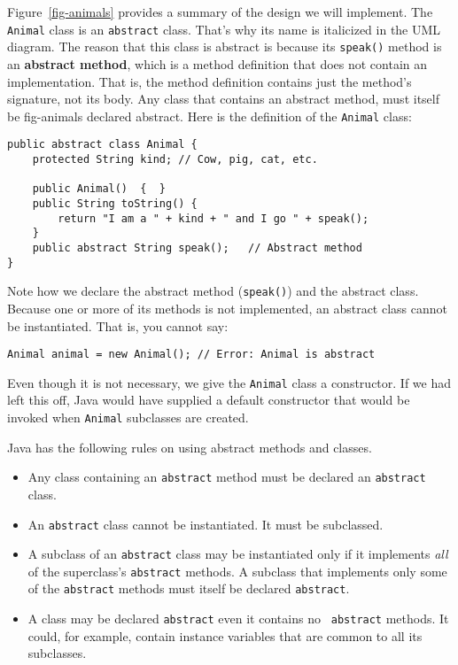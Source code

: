 Figure~\ref{fig-animals} provides a summary of the design we will implement. The
{\tt Animal} class is an {\tt abstract} class. That's why its name is
italicized in the UML diagram. The reason that this class is abstract
is because its {\tt speak()} method is an {\bf abstract method}, which
is a method definition that does not contain an implementation. That
is, the method definition contains just the method's signature, not
its body. Any class that contains an abstract method, must itself be
{fig-animals}
declared abstract. Here is the definition of the {\tt Animal} class:

\begin{jjjlisting}
\begin{lstlisting}
public abstract class Animal {
    protected String kind; // Cow, pig, cat, etc.
         
    public Animal()  {  }
    public String toString() {
        return "I am a " + kind + " and I go " + speak();
    }
    public abstract String speak();   // Abstract method
}
\end{lstlisting}
\end{jjjlisting}

\noindent Note how we declare the abstract method ({\tt speak()}) and
the abstract class.  Because one or more of its methods is not
implemented, an abstract class cannot be instantiated. That is, you
cannot say:

\begin{jjjlisting}
\begin{lstlisting}
Animal animal = new Animal(); // Error: Animal is abstract
\end{lstlisting}
\end{jjjlisting}

\noindent Even though it is not necessary, we give the {\tt Animal} 
class a constructor.  If we had left this off, Java would have
supplied a default constructor that would be invoked when {\tt Animal}
subclasses are created.

Java has the following rules on using abstract methods and
classes.

\begin{itemize}

\item Any class containing an {\tt abstract} method must be declared
an \mbox{\tt abstract} class.

\item An {\tt abstract} class cannot be instantiated.  It must be
subclassed.

\item A subclass of an {\tt abstract} class may be instantiated only
if it implements {\it all} of the superclass's {\tt abstract} methods.
A subclass that implements only some of the {\tt abstract} methods
must itself be declared {\tt abstract}.

\item A class may be declared {\tt abstract} even it contains no {\tt
abstract} methods.  It could, for example, contain instance variables
that are common to all its subclasses.
\end{itemize}

